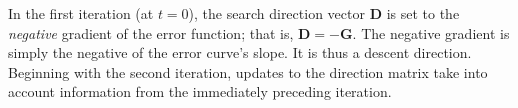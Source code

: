 In the first iteration (at $t = 0$), the search direction vector $\textbf{D}$ is set to the \emph{negative} gradient of the error function; that is,
$\textbf{D} = - \textbf{G}$.  The negative gradient is simply the negative of the error curve's slope. It is thus  a descent direction.
Beginning with the second iteration, updates to the direction matrix take into account information from the immediately preceding iteration.

 





